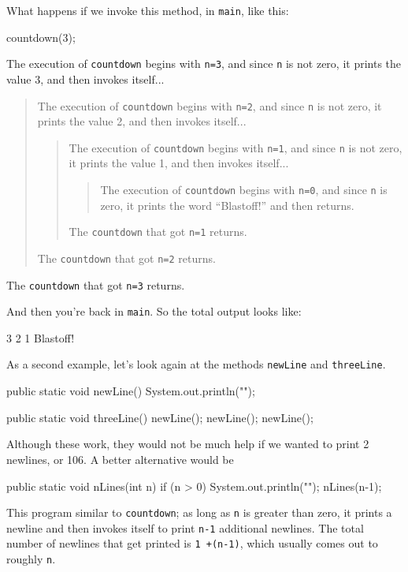 What happens if we invoke this method, in {\tt main}, like
this:

\begin{code}
    countdown(3);
\end{code}
%
The execution of {\tt countdown} begins with {\tt n=3}, and
since {\tt n} is not zero, it prints the value 3, and then
invokes itself...

\begin{quote}
The execution of {\tt countdown} begins with {\tt n=2}, and
since {\tt n} is not zero, it prints the value 2, and then
invokes itself...

\begin{quote}
The execution of {\tt countdown} begins with {\tt n=1}, and
since {\tt n} is not zero, it prints the value 1, and then
invokes itself...

\begin{quote}
The execution of {\tt countdown} begins with {\tt n=0}, and
since {\tt n} is zero, it prints the word ``Blastoff!''
and then returns.
\end{quote}

The {\tt countdown} that got {\tt n=1} returns.

\end{quote}

The {\tt countdown} that got {\tt n=2} returns.

\end{quote}

The {\tt countdown} that got {\tt n=3} returns.

\noindent And then you're back in {\tt main}.  So the
total output looks like:

\begin{stdout}
3
2
1
Blastoff!
\end{stdout}
%
As a second example, let's look again at the methods
{\tt newLine} and {\tt threeLine}.

\begin{code}
  public static void newLine() {
    System.out.println("");
  }

  public static void threeLine() {
    newLine();  newLine();  newLine();
  }
\end{code}
%
Although these work, they would not be much help if we wanted
to print 2 newlines, or 106.  A better alternative would be

\begin{code}
  public static void nLines(int n) {
    if (n > 0) {
      System.out.println("");
      nLines(n-1);
    }
  }
\end{code}
%
This program similar to {\tt countdown}; as long as {\tt n} is greater
than zero, it prints a newline and then invokes itself to
print {\tt n-1} additional newlines.  The total number
of newlines that get printed is {\tt 1 +(n-1)}, which usually
comes out to roughly {\tt n}.

